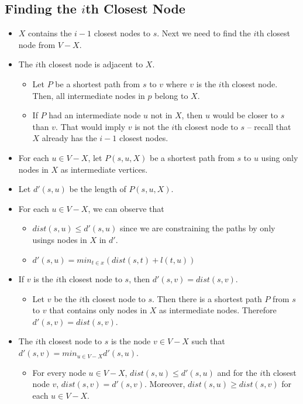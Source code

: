 \subsection{Finding the $i$th Closest Node}
\begin{itemize}
    \item $X$ contains the $i - 1$ closest nodes to $s$. Next we need to find the $i$th closest node from $V - X$.
    \item The $i$th closest node is adjacent to $X$.
    \begin{itemize}
        \item Let $P$ be a shortest path from $s$ to $v$ where $v$ is the $i$th closest node. Then, all intermediate nodes in $p$ belong to $X$.
        \item If $P$ had an intermediate node $u$ not in $X$, then $u$ would be closer to $s$ than $v$. That would imply $v$ is not the $i$th closest node to $s$ -- recall that $X$ already has the $i - 1$ closest nodes.
    \end{itemize}
    \item For each $u \in V - X$, let $P(s, u, X)$ be a shortest path from $s$ to $u$ using only nodes in $X$ as intermediate vertices.
    \item Let $d'(s, u)$ be the length of $P(s, u, X)$.
    \item For each $u \in V - X$, we can observe that
    \begin{itemize}
        \item $dist(s, u) \leq d'(s, u)$ since we are constraining the paths by only usings nodes in $X$ in $d'$.
        \item $d'(s, u) = min_{t \in x}(dist(s, t) + l(t, u))$
    \end{itemize}
    \item If $v$ is the $i$th closest node to $s$, then $d'(s, v) = dist(s, v)$.
    \begin{itemize}
        \item Let $v$ be the $i$th closest node to $s$. Then there is a shortest path $P$ from $s$ to $v$ that contains only nodes in $X$ as intermediate nodes. Therefore $d'(s, v) = dist(s, v)$.
    \end{itemize}
    \item The $i$th closest node to $s$ is the node $v \in V - X$ such that $d'(s, v) = min_{u \in V - X}d'(s, u)$.
    \begin{itemize}
        \item For every node $u \in V - X$, $dist(s, u) \leq d'(s, u)$ and for the $i$th closest node $v$, $dist(s, v) = d'(s, v)$. Moreover, $dist(s, u) \geq dist(s, v)$ for each $u \in V - X$.

\end{itemize}
\end{itemize}
